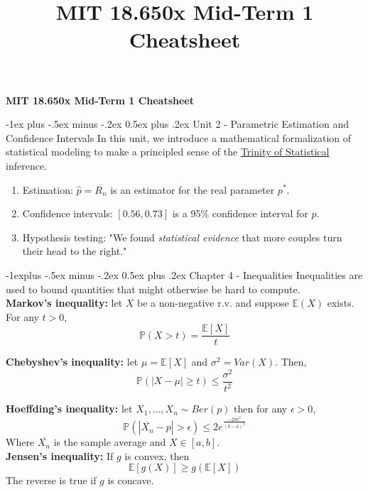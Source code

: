 \documentclass[9pt,landscape]{article}
\title{MIT 18.650x Mid-Term 1 Cheatsheet}
\makeatletter
\renewcommand{\section}{\@startsection{section}{1}{0mm}%
                                {-1ex plus -.5ex minus -.2ex}%
                                {0.5ex plus .2ex}%
                                {\normalfont\large\bfseries}}
\renewcommand{\subsection}{\@startsection{subsection}{2}{0mm}%
                                {-1explus -.5ex minus -.2ex}%
                                {0.5ex plus .2ex}%
                                {\normalfont\normalsize\bfseries}}
\makeatother
\begin{document}
\raggedright
\footnotesize

\begin{center}
    \textbf{MIT 18.650x Mid-Term 1 Cheatsheet}\\
\end{center}
\begin{multicols}{3}
\setlength{\premulticols}{1pt}
\setlength{\postmulticols}{1pt}
\setlength{\multicolsep}{1pt}
\setlength{\columnsep}{1pt}

\section{Unit 2 - Parametric Estimation and Confidence Intervals}
In this unit, we introduce a mathematical formalization of statistical modeling to make a principled sense of the \underline{Trinity of Statistical} inference.

\begin{enumerate}
    \item {Estimation: $\hat{p} = \overline{R_n}$ is an estimator for the real parameter $p^*$.}
    \item {Confidence intervals: $[0.56, 0.73]$ is a 95\% confidence interval for $p$.}
    \item {Hypothesis testing: "We found \textit{statistical evidence} that more couples turn their head to the right."}
\end{enumerate}

\subsection{Chapter 4 - Inequalities}
Inequalities are used to bound quantities that might otherwise be hard to compute. \\

\textbf{Markov's inequality:} let $X$ be a non-negative r.v. and suppose $\mathbb{E}(X)$ exists. For any $t > 0$,
$$\mathbb{P}(X > t) = \frac{\mathbb{E}[X]}{t}$$

\textbf{Chebyshev's inequality:} let $\mu = \mathbb{E}[X]$ and $\sigma^2 = Var(X)$. Then, $$\mathbb{P}(|X - \mu| \ge t) \leq \frac{\sigma^2}{t^2}$$

\textbf{Hoeffding's inequality:} let $X_1, \dots, X_n \sim{} Ber(p)$ then for any $\epsilon > 0$, $$\mathbb{P}(|\overline{X_n} - p| > \epsilon) \leq 2e^{\frac{-2n\epsilon^2}{(b-a)^2}}$$
Where $\overline{X_n}$ is the sample average and $X \in [a, b]$.\\

\textbf{Jensen's inequality:} If $g$ is convex, then $$\mathbb{E}[g(X)] \ge g(\mathbb{E}[X])$$
The reverse is true if $g$ is concave.


\end{multicols}
\end{document}
